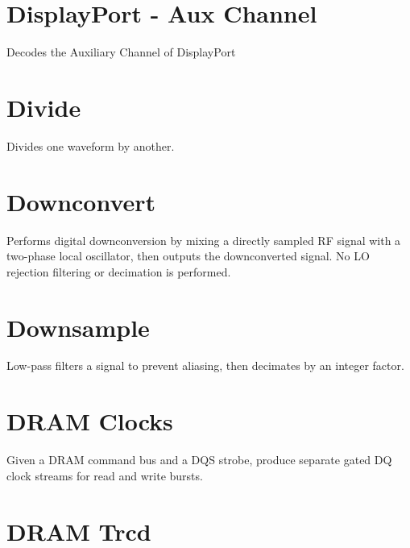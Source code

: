 \section{DisplayPort - Aux Channel}

Decodes the Auxiliary Channel of DisplayPort

\pagebreak
\section{Divide}

Divides one waveform by another.

\pagebreak
\section{Downconvert}

Performs digital downconversion by mixing a directly sampled RF signal with a two-phase local oscillator, then outputs
the downconverted signal. No LO rejection filtering or decimation is performed.

\pagebreak
\section{Downsample}

Low-pass filters a signal to prevent aliasing, then decimates by an integer factor.

\pagebreak
\section{DRAM Clocks}

Given a DRAM command bus and a DQS strobe, produce separate gated DQ clock streams for read and write bursts.

\pagebreak
\section{DRAM Trcd}

